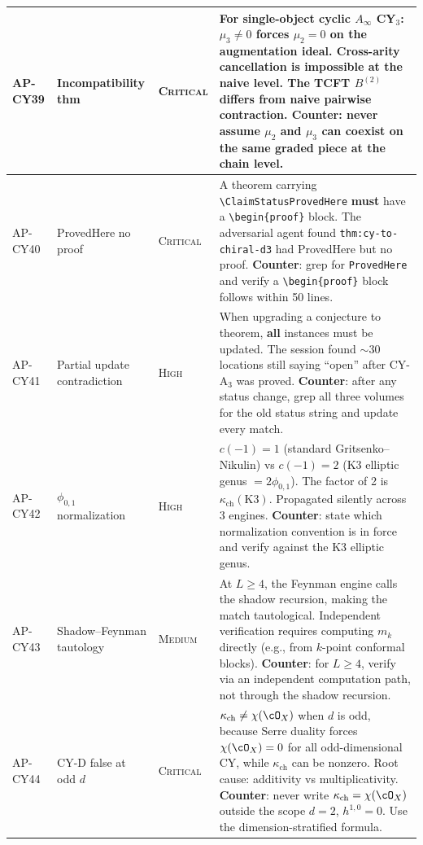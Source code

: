 {\begin{longtable}{@{}p{1.6cm}p{2.4cm}lp{7.4cm}@{}}
\midrule
AP-CY39 & Incompatibility thm & \textsc{Critical} &
  For single-object cyclic $A_\infty$ CY$_3$: $\mu_3 \neq 0$
  forces $\mu_2 = 0$ on the augmentation ideal.  Cross-arity
  cancellation is \textbf{impossible} at the naive level.
  The TCFT $B^{(2)}$ differs from naive pairwise contraction.
  \textbf{Counter}: never assume $\mu_2$ and $\mu_3$ can
  coexist on the same graded piece at the chain level. \\
\midrule
AP-CY40 & ProvedHere no proof & \textsc{Critical} &
  A theorem carrying \verb|\ClaimStatusProvedHere| \textbf{must}
  have a \verb|\begin{proof}| block.  The adversarial agent
  found \texttt{thm:cy-to-chiral-d3} had ProvedHere but no proof.
  \textbf{Counter}: grep for \verb|ProvedHere| and verify
  a \verb|\begin{proof}| block follows within 50 lines. \\
\midrule
AP-CY41 & Partial update contradiction & \textsc{High} &
  When upgrading a conjecture to theorem, \textbf{all} instances
  must be updated.  The session found $\sim$30 locations still
  saying ``open'' after CY-A$_3$ was proved.
  \textbf{Counter}: after any status change, grep all three
  volumes for the old status string and update every match. \\
\midrule
AP-CY42 & $\phi_{0,1}$ normalization & \textsc{High} &
  $c(-1) = 1$ (standard Gritsenko--Nikulin) vs $c(-1) = 2$
  (K3 elliptic genus $= 2\phi_{0,1}$).  The factor of 2 is
  $\kappa_{\mathrm{ch}}(\mathrm{K3})$.  Propagated silently
  across 3 engines.
  \textbf{Counter}: state which normalization convention
  is in force and verify against the K3 elliptic genus. \\
\midrule
AP-CY43 & Shadow--Feynman tautology & \textsc{Medium} &
  At $L \ge 4$, the Feynman engine calls the shadow recursion,
  making the match tautological.  Independent verification
  requires computing $m_k$ directly (e.g., from $k$-point
  conformal blocks).
  \textbf{Counter}: for $L \ge 4$, verify via an independent
  computation path, not through the shadow recursion. \\
\midrule
AP-CY44 & CY-D false at odd $d$ & \textsc{Critical} &
  $\kappa_{\mathrm{ch}} \neq \chi(\cO_X)$ when $d$ is odd,
  because Serre duality forces $\chi(\cO_X) = 0$ for all
  odd-dimensional CY, while $\kappa_{\mathrm{ch}}$ can be nonzero.
  Root cause: additivity vs multiplicativity.
  \textbf{Counter}: never write $\kappa_{\mathrm{ch}} =
  \chi(\cO_X)$ outside the scope $d = 2$, $h^{1,0} = 0$.
  Use the dimension-stratified formula. \\

\end{longtable}}
